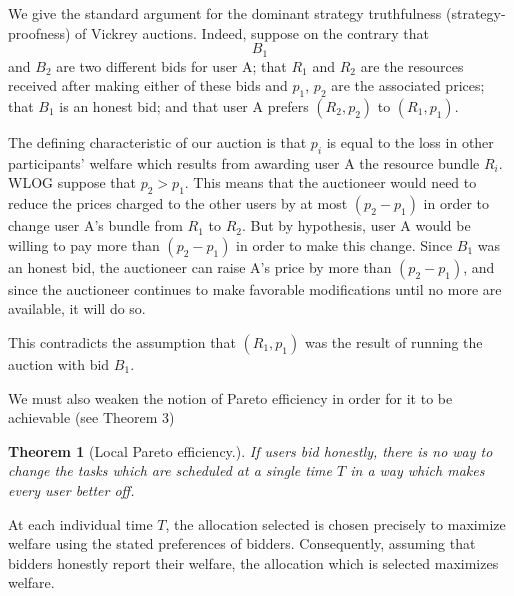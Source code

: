 \documentclass{acm_proc_article-sp}
\newtheorem{theorem}{Theorem}[section]
\newenvironment{pproof}[1][Proof]{\begin{trivlist}
\item[\hskip \labelsep {\bfseries #1}]}{\end{trivlist}}
\begin{document}
\begin{pproof}
We give the standard argument for the dominant strategy truthfulness (strategy-proofness) of Vickrey auctions. 
Indeed, suppose on the contrary 
that $$B_1$$ and $B_2$ are two different bids for user A; that $R_1$ and $R_2$ are the resources received after making either of these bids and $p_1$, $p_2$ are the associated prices; that $B_1$ is an honest bid; and that user A prefers $(R_2, p_2)$ to $(R_1, p_1)$.

The defining characteristic of our auction is that $p_i$ is equal to the loss in other participants' welfare which results from awarding user A the resource bundle $R_i$. 
WLOG suppose that $p_2> p_1$.
This means that the auctioneer would need to reduce the prices charged to the other users by at most $(p_2 - p_1)$ in order to change user A's bundle from $R_1$ to $R_2$. 
But by hypothesis, user A would be willing to pay more than $(p_2 - p_1)$ in order to make this change. 
Since $B_1$ was an honest bid, the auctioneer can raise A's price by more than $(p_2 - p_1)$, 
and since the auctioneer continues to make favorable modifications until no more are available, it will do so.

This contradicts the assumption that $(R_1, p_1)$ was the result of running the auction with bid $B_1$. 
\end{pproof}

We must also weaken the notion of Pareto efficiency in order for it to be achievable (see Theorem 3)


\begin{theorem}[Local Pareto efficiency.]
If users bid honestly, 
there is no way to change the tasks which are scheduled at a single time $T$ in a way which makes every user better off.
\end{theorem}

\begin{pproof}
At each individual time $T$, the allocation selected is chosen precisely to maximize welfare using the stated preferences of bidders. 
Consequently, assuming that bidders honestly report their welfare, the allocation which is selected maximizes welfare.
\end{pproof}
\end{document}
